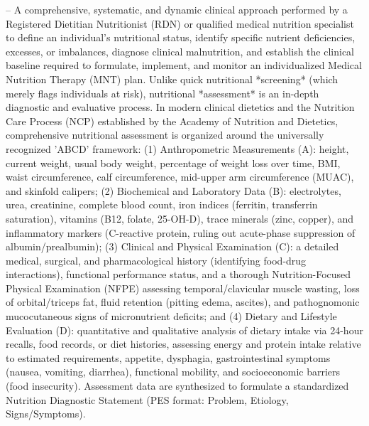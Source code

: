 -- A comprehensive, systematic, and dynamic clinical approach performed by a Registered Dietitian Nutritionist (RDN) or qualified medical nutrition specialist to define an individual's nutritional status, identify specific nutrient deficiencies, excesses, or imbalances, diagnose clinical malnutrition, and establish the clinical baseline required to formulate, implement, and monitor an individualized Medical Nutrition Therapy (MNT) plan. Unlike quick nutritional *screening* (which merely flags individuals at risk), nutritional *assessment* is an in-depth diagnostic and evaluative process. In modern clinical dietetics and the Nutrition Care Process (NCP) established by the Academy of Nutrition and Dietetics, comprehensive nutritional assessment is organized around the universally recognized 'ABCD' framework: (1) Anthropometric Measurements (A): height, current weight, usual body weight, percentage of weight loss over time, BMI, waist circumference, calf circumference, mid-upper arm circumference (MUAC), and skinfold calipers; (2) Biochemical and Laboratory Data (B): electrolytes, urea, creatinine, complete blood count, iron indices (ferritin, transferrin saturation), vitamins (B12, folate, 25-OH-D), trace minerals (zinc, copper), and inflammatory markers (C-reactive protein, ruling out acute-phase suppression of albumin/prealbumin); (3) Clinical and Physical Examination (C): a detailed medical, surgical, and pharmacological history (identifying food-drug interactions), functional performance status, and a thorough Nutrition-Focused Physical Examination (NFPE) assessing temporal/clavicular muscle wasting, loss of orbital/triceps fat, fluid retention (pitting edema, ascites), and pathognomonic mucocutaneous signs of micronutrient deficits; and (4) Dietary and Lifestyle Evaluation (D): quantitative and qualitative analysis of dietary intake via 24-hour recalls, food records, or diet histories, assessing energy and protein intake relative to estimated requirements, appetite, dysphagia, gastrointestinal symptoms (nausea, vomiting, diarrhea), functional mobility, and socioeconomic barriers (food insecurity). Assessment data are synthesized to formulate a standardized Nutrition Diagnostic Statement (PES format: Problem, Etiology, Signs/Symptoms).

